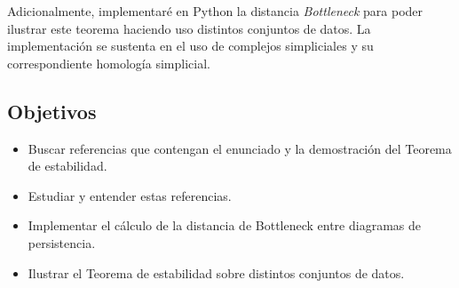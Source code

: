 Adicionalmente, implementaré en Python la distancia \textit{Bottleneck} para poder ilustrar este teorema haciendo uso distintos conjuntos de datos. La implementación se sustenta en el uso de complejos simpliciales y su correspondiente homología simplicial.

\subsection*{Objetivos}
\begin{itemize}
	\item Buscar referencias que contengan el enunciado y la demostración del Teorema de estabilidad.
	\item Estudiar y entender estas referencias.
	\item Implementar el cálculo de la distancia de Bottleneck entre diagramas de persistencia.
	\item Ilustrar el Teorema de estabilidad sobre distintos conjuntos de datos.
\end{itemize}
